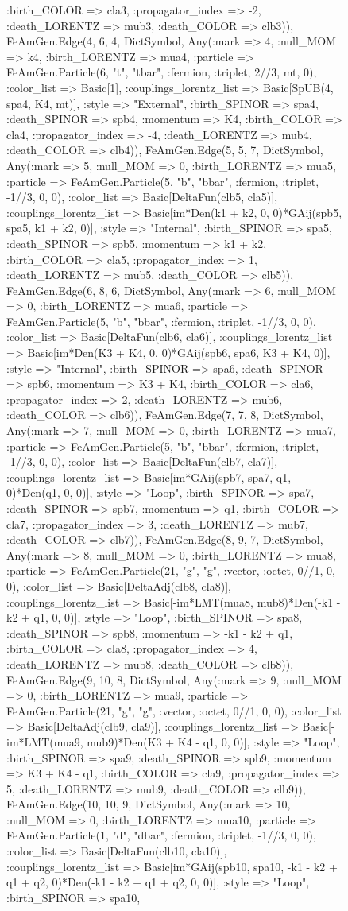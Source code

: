 \documentclass{revtex4}
\begin{document}
\begin{figure}[!htb]
\begin{center}
{:birth_COLOR => cla3, :propagator_index => -2, :death_LORENTZ => mub3, :death_COLOR => clb3)), FeAmGen.Edge(4, 6, 4, Dict{Symbol, Any}(:mark => 4, :null_MOM => k4, :birth_LORENTZ => mua4, :particle => FeAmGen.Particle(6, "t", "tbar", :fermion, :triplet, 2//3, mt, 0), :color_list => Basic[1], :couplings_lorentz_list => Basic[SpUB(4, spa4, K4, mt)], :style => "External", :birth_SPINOR => spa4, :death_SPINOR => spb4, :momentum => K4, :birth_COLOR => cla4, :propagator_index => -4, :death_LORENTZ => mub4, :death_COLOR => clb4)), FeAmGen.Edge(5, 5, 7, Dict{Symbol, Any}(:mark => 5, :null_MOM => 0, :birth_LORENTZ => mua5, :particle => FeAmGen.Particle(5, "b", "bbar", :fermion, :triplet, -1//3, 0, 0), :color_list => Basic[DeltaFun(clb5, cla5)], :couplings_lorentz_list => Basic[im*Den(k1 + k2, 0, 0)*GAij(spb5, spa5, k1 + k2, 0)], :style => "Internal", :birth_SPINOR => spa5, :death_SPINOR => spb5, :momentum => k1 + k2, :birth_COLOR => cla5, :propagator_index => 1, :death_LORENTZ => mub5, :death_COLOR => clb5)), FeAmGen.Edge(6, 8, 6, Dict{Symbol, Any}(:mark => 6, :null_MOM => 0, :birth_LORENTZ => mua6, :particle => FeAmGen.Particle(5, "b", "bbar", :fermion, :triplet, -1//3, 0, 0), :color_list => Basic[DeltaFun(clb6, cla6)], :couplings_lorentz_list => Basic[im*Den(K3 + K4, 0, 0)*GAij(spb6, spa6, K3 + K4, 0)], :style => "Internal", :birth_SPINOR => spa6, :death_SPINOR => spb6, :momentum => K3 + K4, :birth_COLOR => cla6, :propagator_index => 2, :death_LORENTZ => mub6, :death_COLOR => clb6)), FeAmGen.Edge(7, 7, 8, Dict{Symbol, Any}(:mark => 7, :null_MOM => 0, :birth_LORENTZ => mua7, :particle => FeAmGen.Particle(5, "b", "bbar", :fermion, :triplet, -1//3, 0, 0), :color_list => Basic[DeltaFun(clb7, cla7)], :couplings_lorentz_list => Basic[im*GAij(spb7, spa7, q1, 0)*Den(q1, 0, 0)], :style => "Loop", :birth_SPINOR => spa7, :death_SPINOR => spb7, :momentum => q1, :birth_COLOR => cla7, :propagator_index => 3, :death_LORENTZ => mub7, :death_COLOR => clb7)), FeAmGen.Edge(8, 9, 7, Dict{Symbol, Any}(:mark => 8, :null_MOM => 0, :birth_LORENTZ => mua8, :particle => FeAmGen.Particle(21, "g", "g", :vector, :octet, 0//1, 0, 0), :color_list => Basic[DeltaAdj(clb8, cla8)], :couplings_lorentz_list => Basic[-im*LMT(mua8, mub8)*Den(-k1 - k2 + q1, 0, 0)], :style => "Loop", :birth_SPINOR => spa8, :death_SPINOR => spb8, :momentum => -k1 - k2 + q1, :birth_COLOR => cla8, :propagator_index => 4, :death_LORENTZ => mub8, :death_COLOR => clb8)), FeAmGen.Edge(9, 10, 8, Dict{Symbol, Any}(:mark => 9, :null_MOM => 0, :birth_LORENTZ => mua9, :particle => FeAmGen.Particle(21, "g", "g", :vector, :octet, 0//1, 0, 0), :color_list => Basic[DeltaAdj(clb9, cla9)], :couplings_lorentz_list => Basic[-im*LMT(mua9, mub9)*Den(K3 + K4 - q1, 0, 0)], :style => "Loop", :birth_SPINOR => spa9, :death_SPINOR => spb9, :momentum => K3 + K4 - q1, :birth_COLOR => cla9, :propagator_index => 5, :death_LORENTZ => mub9, :death_COLOR => clb9)), FeAmGen.Edge(10, 10, 9, Dict{Symbol, Any}(:mark => 10, :null_MOM => 0, :birth_LORENTZ => mua10, :particle => FeAmGen.Particle(1, "d", "dbar", :fermion, :triplet, -1//3, 0, 0), :color_list => Basic[DeltaFun(clb10, cla10)], :couplings_lorentz_list => Basic[im*GAij(spb10, spa10, -k1 - k2 + q1 + q2, 0)*Den(-k1 - k2 + q1 + q2, 0, 0)], :style => "Loop", :birth_SPINOR => spa10, }
\end{center}
\end{figure}
\end{document}

